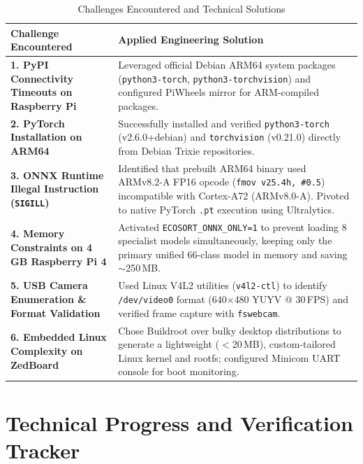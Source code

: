 \documentclass[12pt,a4paper]{article}
\begin{document}
\begin{table}[H]
\centering
\caption{Challenges Encountered and Technical Solutions}\label{tab:challenges}
\begin{tabular}{p{4.2cm}p{9.8cm}}
\toprule
\textbf{Challenge Encountered} & \textbf{Applied Engineering Solution} \\
\midrule
\textbf{1. PyPI Connectivity Timeouts on Raspberry Pi}
  & Leveraged official Debian ARM64 system packages (\texttt{python3-torch}, \texttt{python3-torchvision}) and configured PiWheels mirror for ARM-compiled packages. \\[8pt]

\textbf{2. PyTorch Installation on ARM64}
  & Successfully installed and verified \texttt{python3-torch} (v2.6.0+debian) and \texttt{torchvision} (v0.21.0) directly from Debian Trixie repositories. \\[8pt]

\textbf{3. ONNX Runtime Illegal Instruction (\texttt{SIGILL})}
  & Identified that prebuilt ARM64 binary used ARMv8.2-A FP16 opcode (\texttt{fmov v25.4h, \#0.5}) incompatible with Cortex-A72 (ARMv8.0-A). Pivoted to native PyTorch \texttt{.pt} execution using Ultralytics. \\[8pt]

\textbf{4. Memory Constraints on 4\,GB Raspberry Pi 4}
  & Activated \texttt{ECOSORT\_ONNX\_ONLY=1} to prevent loading 8 specialist models simultaneously, keeping only the primary unified 66-class model in memory and saving $\sim$250\,MB. \\[8pt]

\textbf{5. USB Camera Enumeration \& Format Validation}
  & Used Linux V4L2 utilities (\texttt{v4l2-ctl}) to identify \texttt{/dev/video0} format (640$\times$480 YUYV @ 30\,FPS) and verified frame capture with \texttt{fswebcam}. \\[8pt]

\textbf{6. Embedded Linux Complexity on ZedBoard}
  & Chose Buildroot over bulky desktop distributions to generate a lightweight ($<$20\,MB), custom-tailored Linux kernel and rootfs; configured Minicom UART console for boot monitoring. \\
\bottomrule
\end{tabular}
\end{table}

\clearpage

\section{Technical Progress and Verification Tracker}
\end{document}
